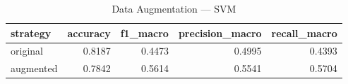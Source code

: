 \begin{table}
\caption{Data Augmentation — SVM}
\begin{tabular}{lrrrr}
\toprule
strategy & accuracy & f1_macro & precision_macro & recall_macro \\
\midrule
original & 0.8187 & 0.4473 & 0.4995 & 0.4393 \\
augmented & 0.7842 & 0.5614 & 0.5541 & 0.5704 \\
\bottomrule
\end{tabular}
\end{table}
